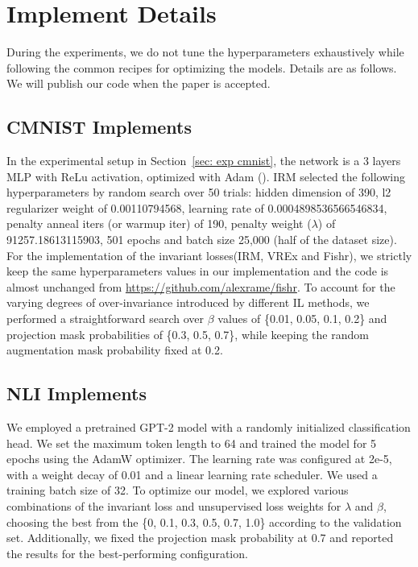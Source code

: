 \section{Implement Details}
During the experiments, we do not tune the hyperparameters exhaustively while following the
common recipes for optimizing the models. Details are as follows.
We will publish our code when the paper is accepted.

\subsection{CMNIST Implements}
In the experimental setup in Section~\ref{sec: exp cmnist}, the network is a 3 layers MLP with ReLu activation, optimized with Adam (\cite{adam}). 
IRM selected the following hyperparameters by random search over 50 trials: hidden dimension of 390, l2 regularizer weight of 0.00110794568, learning rate of 0.0004898536566546834, penalty anneal iters (or warmup iter) of 190, penalty weight ($\lambda$) of 91257.18613115903, 501 epochs and batch size 25,000 (half of the dataset size). 
For the implementation of the invariant losses(IRM, VREx and Fishr), we strictly keep the same hyperparameters values in our implementation and the code is almost unchanged from
\url{https://github.com/alexrame/fishr}.
To account for the varying degrees of over-invariance introduced by different IL methods, we performed a straightforward search over \(\beta\) values of \{0.01, 0.05, 0.1, 0.2\} and projection mask probabilities of \{0.3, 0.5, 0.7\}, while keeping the random augmentation mask probability fixed at 0.2.

\subsection{NLI Implements}
We employed a pretrained GPT-2 model with a randomly initialized classification head. 
We set the maximum token length to 64 and trained the model for 5 epochs using the AdamW optimizer. The learning rate was configured at 2e-5, with a weight decay of 0.01 and a linear learning rate scheduler. 
We used a training batch size of 32.
To optimize our model, we explored various combinations of the invariant loss and unsupervised loss weights for \( \lambda \) and \( \beta \), choosing the best from the \{0, 0.1, 0.3, 0.5, 0.7, 1.0\} according to the validation set.
Additionally, we fixed the projection mask probability at 0.7 and reported the results for the best-performing configuration.

